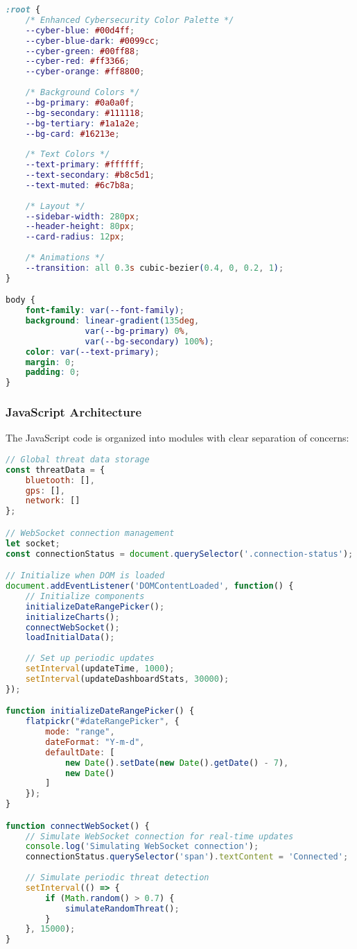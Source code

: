 \documentclass[12pt,a4paper]{report}
\begin{document}
\begin{lstlisting}[language=CSS, caption=CSS Variables and Theme]
:root {
    /* Enhanced Cybersecurity Color Palette */
    --cyber-blue: #00d4ff;
    --cyber-blue-dark: #0099cc;
    --cyber-green: #00ff88;
    --cyber-red: #ff3366;
    --cyber-orange: #ff8800;
    
    /* Background Colors */
    --bg-primary: #0a0a0f;
    --bg-secondary: #111118;
    --bg-tertiary: #1a1a2e;
    --bg-card: #16213e;
    
    /* Text Colors */
    --text-primary: #ffffff;
    --text-secondary: #b8c5d1;
    --text-muted: #6c7b8a;
    
    /* Layout */
    --sidebar-width: 280px;
    --header-height: 80px;
    --card-radius: 12px;
    
    /* Animations */
    --transition: all 0.3s cubic-bezier(0.4, 0, 0.2, 1);
}

body {
    font-family: var(--font-family);
    background: linear-gradient(135deg, 
                var(--bg-primary) 0%, 
                var(--bg-secondary) 100%);
    color: var(--text-primary);
    margin: 0;
    padding: 0;
}
\end{lstlisting}

\subsubsection{JavaScript Architecture}
The JavaScript code is organized into modules with clear separation of concerns:

\begin{lstlisting}[language=JavaScript, caption=Main JavaScript Structure]
// Global threat data storage
const threatData = {
    bluetooth: [],
    gps: [],
    network: []
};

// WebSocket connection management
let socket;
const connectionStatus = document.querySelector('.connection-status');

// Initialize when DOM is loaded
document.addEventListener('DOMContentLoaded', function() {
    // Initialize components
    initializeDateRangePicker();
    initializeCharts();
    connectWebSocket();
    loadInitialData();
    
    // Set up periodic updates
    setInterval(updateTime, 1000);
    setInterval(updateDashboardStats, 30000);
});

function initializeDateRangePicker() {
    flatpickr("#dateRangePicker", {
        mode: "range",
        dateFormat: "Y-m-d",
        defaultDate: [
            new Date().setDate(new Date().getDate() - 7), 
            new Date()
        ]
    });
}

function connectWebSocket() {
    // Simulate WebSocket connection for real-time updates
    console.log('Simulating WebSocket connection');
    connectionStatus.querySelector('span').textContent = 'Connected';
    
    // Simulate periodic threat detection
    setInterval(() => {
        if (Math.random() > 0.7) {
            simulateRandomThreat();
        }
    }, 15000);
}
\end{lstlisting}
\end{document}
